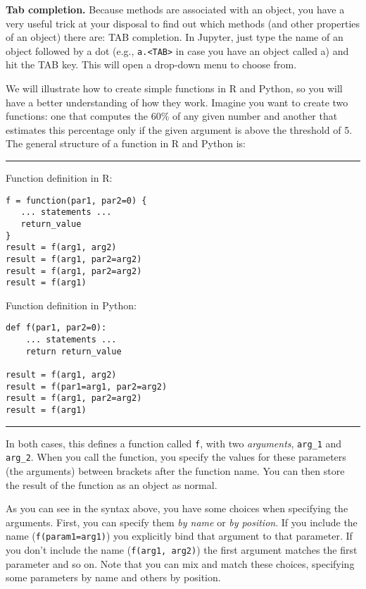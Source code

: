 \begin{feature}\textbf{Tab completion.} Because methods are associated with an object, you have a very
  useful trick at your disposal to find out which methods (and other
  properties of an object) there are: TAB completion. In Jupyter, just
  type the name of an object followed by a dot (e.g., \texttt{a.<TAB>} in case you
  have an object called a) and hit the TAB key. This will open a
  drop-down menu to choose from.
\end{feature}

We will illustrate how to create simple functions in R and Python, so you
will have a better understanding of how they work. Imagine you want to
create two functions: one that computes the 60\% of any given number
and another that estimates this percentage only if the given argument
is above the threshold of 5.
The general structure of a function in R and Python is:

\noindent\rule{\textwidth}{.5pt}\vspace{-1em}

\noindent\begin{minipage}[t]{.5\textwidth}
  Function definition in R:
\begin{verbatim}
f = function(par1, par2=0) {
   ... statements ... 
   return_value
}
result = f(arg1, arg2)
result = f(arg1, par2=arg2)
result = f(arg1, par2=arg2)
result = f(arg1)
\end{verbatim}
\end{minipage}
\begin{minipage}[t]{.45\textwidth}
  Function definition in Python:
\begin{verbatim}
def f(par1, par2=0):
    ... statements ...
    return return_value   

result = f(arg1, arg2)
result = f(par1=arg1, par2=arg2)
result = f(arg1, par2=arg2)
result = f(arg1)
\end{verbatim}
\end{minipage}
\vspace{.5em}

\noindent\rule{\textwidth}{.5pt}

In both cases, this defines a function called \verb|f|,
with two \emph{arguments}, \verb|arg_1| and \verb|arg_2|.
When you call the function, you specify the values for these parameters (the arguments) between brackets after the function name.
You can then store the result of the function as an object as normal.

As you can see in the syntax above, you have some choices when specifying the arguments.
First, you can specify them \emph{by name} or \emph{by position}.
If you include the name (\verb|f(param1=arg1)|) you explicitly bind that argument to that parameter.
If you don't include the name (\verb|f(arg1, arg2)|) the first argument matches the first parameter and so on.
Note that you can mix and match these choices, specifying some parameters by name and others by position.

